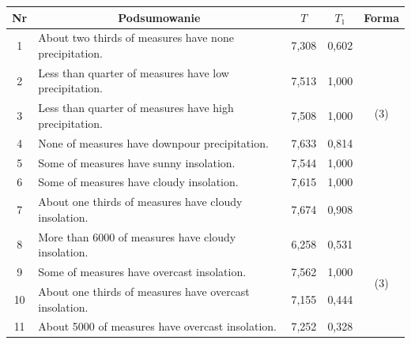 \documentclass{classrep}
\begin{document}
\begin{table}[H]
\begin{center}
\begin{tabularx}{\linewidth}{ |c|X|c|c|c| } 
\hline
Nr & \multicolumn{1}{|c|}{Podsumowanie} & $T$ & $T_1$ & Forma \\
\hline
1	&	About two thirds of measures have none precipitation.	&	7,308	&	0,602 & \multirow{4}{1em}{\newline\newline\newline(3)} \\ \cline{1-4}
2	&	Less than quarter of measures have low precipitation.	&	7,513	&	1,000	& \\	\cline{1-4}
3	&	Less than quarter of measures have high precipitation.	&	7,508	&	1,000	& \\	\cline{1-4}
4	&	None of measures have downpour precipitation.	&	7,633	&	0,814	& \\
\hline
\hline
5	&	Some of measures have sunny insolation.	&	7,544	&	1,000 &	\multirow{7}{1em}{\newline\newline\newline\newline\newline(3)} \\ \cline{1-4}
6	&	Some of measures have cloudy insolation.	&	7,615	&	1,000	& \\	\cline{1-4}
7	&	About one thirds of measures have cloudy insolation.	&	7,674	&	0,908	& \\	\cline{1-4}
8	&	More than 6000 of measures have cloudy insolation.	&	6,258	&	0,531	& \\	\cline{1-4}
9	&	Some of measures have overcast insolation.	&	7,562	&	1,000	& \\	\cline{1-4}
10	&	About one thirds of measures have overcast insolation.	&	7,155	&	0,444	& \\	\cline{1-4}
11	&	About 5000 of measures have overcast insolation.	&	7,252	&	0,328	& \\	
\hline
\hline


\end{tabularx}
\end{center}
\end{table}
\end{document}
